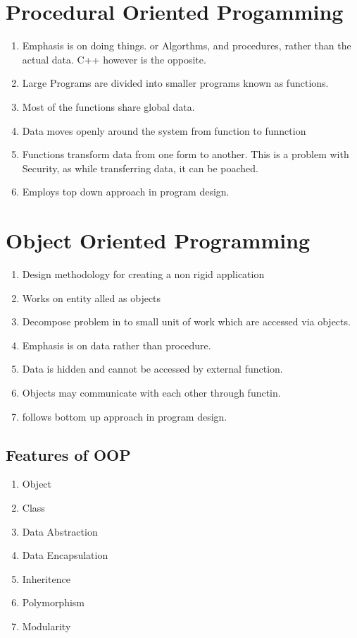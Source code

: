 \documentclass[11pt]{article}
\begin{document}
\clearpage
\tableofcontents
\clearpage

\section{Procedural Oriented Progamming}
\begin{enumerate}
    \item Emphasis is on doing things. or Algorthms, and procedures, rather than the actual data. C++ however is the opposite.
    \item Large Programs are divided into smaller programs known as functions. 
    \item Most of the functions share global data. 
    \item Data moves openly around the system from function to funnction
    \item Functions transform data from one form to another. This is a problem with Security, as while transferring data, it can be poached. 
    \item Employs top down approach in program design. 
\end{enumerate}

\section{Object Oriented Programming }

\begin{enumerate}
    \item Design methodology for creating a non rigid application
    \item Works on entity alled as objects
    \item Decompose problem in to small unit of work which are accessed via objects. 
    \item Emphasis is on data rather than procedure. 
    \item Data is hidden and cannot be accessed by external function. 
    \item Objects may communicate with each other through functin. 
    \item follows bottom up approach in program design. 
\end{enumerate}


\subsection{Features of OOP}
\begin{enumerate}
    \item Object
    \item Class
    \item Data Abstraction
    \item Data Encapsulation
    \item Inheritence
    \item Polymorphism
    \item Modularity
\end{enumerate}
\end{document}
